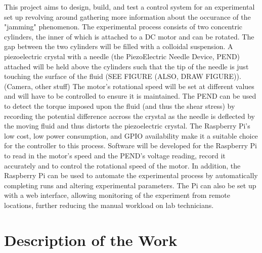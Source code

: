 \documentclass{report}
\begin{document}
	This project aims to design, build, and test a control system for an experimental set up revolving around gathering more information about the occurance of the "jamming" phenomenon. The experimental process consists of two concentric cylinders, the inner of which is attached to a DC motor and can be rotated. The gap between the two cylinders will be filled with a colloidal suspension. A piezoelectric crystal with a needle (the PiezoElectric Needle Device, PEND) attached will be held above the cylinders such that the tip of the needle is just touching the surface of the fluid (SEE FIGURE (ALSO, DRAW FIGURE)). (Camera, other stuff) \newline \newline \noindent
	The motor's rotational speed will be set at different values and will have to be controlled to ensure it is maintained. The PEND can be used to detect the torque imposed upon the fluid (and thus the shear stress) by recording the potential difference accross the crystal as the needle is deflected by the moving fluid and thus distorts the piezoelectric crystal.  \newline \newline \noindent
	The Raspberry Pi's low cost, low power consumption, and GPIO availability make it a suitable choice for the controller to this process. Software will be developed for the Raspberry Pi to read in the motor's speed and the PEND's voltage reading, record it accurately and to control the rotational speed of the motor. In addition, the Raspberry Pi can be used to automate the experimental process by automatically completing runs and altering experimental parameters. The Pi can also be set up with a web interface, allowing monitoring of the experiment from remote locations, further reducing the manual workload on lab technicians.

	
	\chapter*{Description of the Work}
\end{document}
